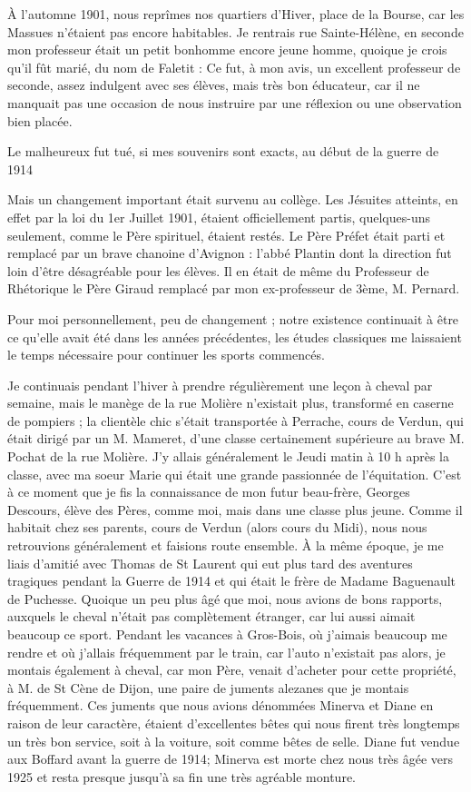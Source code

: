 \documentclass[11pt,a4paper]{report}
\begin{document}
À l'automne 1901, nous reprîmes nos quartiers d'Hiver, place de la Bourse, car les Massues n'étaient pas encore habitables. Je rentrais rue Sainte-Hélène, en seconde mon professeur était un petit bonhomme encore jeune homme, quoique je crois qu'il fût marié, du nom de Faletit : Ce fut, à mon avis, un excellent professeur de seconde, assez indulgent avec ses élèves, mais très bon éducateur, car il ne manquait pas une occasion de nous instruire par une réflexion ou une observation bien placée.

Le malheureux fut tué, si mes souvenirs sont exacts, au début de la guerre de 1914

Mais un changement important était survenu au collège. Les Jésuites atteints, en effet par la loi du 1er Juillet 1901, étaient officiellement partis, quelques-uns seulement, comme le Père spirituel, étaient restés. Le Père Préfet était parti et remplacé par un brave chanoine d'Avignon : l'abbé Plantin dont la direction fut loin d'être désagréable pour les élèves. Il en était de même du Professeur de Rhétorique le Père Giraud remplacé par mon ex-professeur de 3ème, M. Pernard.

Pour moi personnellement, peu de changement ; notre existence continuait à être ce qu'elle avait été dans les années précédentes, les études classiques me laissaient le temps nécessaire pour continuer les sports commencés.

Je continuais pendant l'hiver à prendre régulièrement une leçon à cheval par semaine, mais le manège de la rue Molière n'existait plus, transformé en caserne de pompiers ; la clientèle chic s'était transportée à Perrache, cours de Verdun, qui était dirigé par un M. Mameret, d'une classe certainement supérieure au brave M. Pochat de la rue Molière. J'y allais généralement le Jeudi matin à 10 h après la classe, avec ma soeur Marie qui était une grande passionnée de l'équitation. C'est à ce moment que je fis la connaissance de mon futur beau-frère, Georges Descours, élève des Pères, comme moi, mais dans une classe plus jeune. Comme il habitait chez ses parents, cours de Verdun (alors cours du Midi), nous nous retrouvions généralement et faisions route ensemble. À la même époque, je me liais d'amitié avec Thomas de St Laurent qui eut plus tard des aventures tragiques pendant la Guerre de 1914 et qui était le frère de Madame Baguenault de Puchesse. Quoique un peu plus âgé que moi, nous avions de bons rapports, auxquels le cheval n'était pas complètement étranger, car lui aussi aimait beaucoup ce sport. Pendant les vacances à Gros-Bois, où j'aimais beaucoup me rendre et où j'allais fréquemment par le train, car l'auto n'existait pas alors, je montais également à cheval, car mon Père, venait d'acheter pour cette propriété, à M. de St Cène de Dijon, une paire de juments alezanes que je montais fréquemment. Ces juments que nous avions dénommées Minerva et Diane en raison de leur caractère, étaient d'excellentes bêtes qui nous firent très longtemps un très bon service, soit à la voiture, soit comme bêtes de selle. Diane fut vendue aux Boffard avant la guerre de 1914; Minerva est morte chez nous très âgée vers 1925 et resta presque jusqu'à sa fin une très agréable monture.
\end{document}
